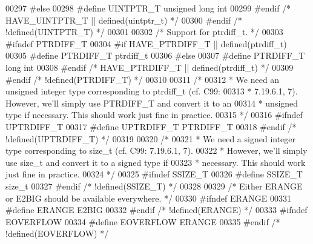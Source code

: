 \begin{DoxyCode}
{00297 \textcolor{preprocessor}{#else}
00298 \textcolor{preprocessor}{#define UINTPTR\_T unsigned long int}
00299 \textcolor{preprocessor}{#endif  }\textcolor{comment}{/* HAVE\_UINTPTR\_T || defined(uintptr\_t) */}\textcolor{preprocessor}{}
00300 \textcolor{preprocessor}{#endif  }\textcolor{comment}{/* !defined(UINTPTR\_T) */}\textcolor{preprocessor}{}
00301 
00302 \textcolor{comment}{/* Support for ptrdiff\_t. */}
00303 \textcolor{preprocessor}{#ifndef PTRDIFF\_T}
00304 \textcolor{preprocessor}{#if HAVE\_PTRDIFF\_T || defined(ptrdiff\_t)}
00305 \textcolor{preprocessor}{#define PTRDIFF\_T ptrdiff\_t}
00306 \textcolor{preprocessor}{#else}
00307 \textcolor{preprocessor}{#define PTRDIFF\_T long int}
00308 \textcolor{preprocessor}{#endif  }\textcolor{comment}{/* HAVE\_PTRDIFF\_T || defined(ptrdiff\_t) */}\textcolor{preprocessor}{}
00309 \textcolor{preprocessor}{#endif  }\textcolor{comment}{/* !defined(PTRDIFF\_T) */}\textcolor{preprocessor}{}
00310 
00311 \textcolor{comment}{/*}
00312 \textcolor{comment}{ * We need an unsigned integer type corresponding to ptrdiff\_t (cf. C99:}
00313 \textcolor{comment}{ * 7.19.6.1, 7).  However, we'll simply use PTRDIFF\_T and convert it to an}
00314 \textcolor{comment}{ * unsigned type if necessary.  This should work just fine in practice.}
00315 \textcolor{comment}{ */}
00316 \textcolor{preprocessor}{#ifndef UPTRDIFF\_T}
00317 \textcolor{preprocessor}{#define UPTRDIFF\_T PTRDIFF\_T}
00318 \textcolor{preprocessor}{#endif  }\textcolor{comment}{/* !defined(UPTRDIFF\_T) */}\textcolor{preprocessor}{}
00319 
00320 \textcolor{comment}{/*}
00321 \textcolor{comment}{ * We need a signed integer type corresponding to size\_t (cf. C99: 7.19.6.1, 7).}
00322 \textcolor{comment}{ * However, we'll simply use size\_t and convert it to a signed type if}
00323 \textcolor{comment}{ * necessary.  This should work just fine in practice.}
00324 \textcolor{comment}{ */}
00325 \textcolor{preprocessor}{#ifndef SSIZE\_T}
00326 \textcolor{preprocessor}{#define SSIZE\_T size\_t}
00327 \textcolor{preprocessor}{#endif  }\textcolor{comment}{/* !defined(SSIZE\_T) */}\textcolor{preprocessor}{}
00328 
00329 \textcolor{comment}{/* Either ERANGE or E2BIG should be available everywhere. */}
00330 \textcolor{preprocessor}{#ifndef ERANGE}
00331 \textcolor{preprocessor}{#define ERANGE E2BIG}
00332 \textcolor{preprocessor}{#endif  }\textcolor{comment}{/* !defined(ERANGE) */}\textcolor{preprocessor}{}
00333 \textcolor{preprocessor}{#ifndef EOVERFLOW}
00334 \textcolor{preprocessor}{#define EOVERFLOW ERANGE}
00335 \textcolor{preprocessor}{#endif  }\textcolor{comment}{/* !defined(EOVERFLOW) */}\textcolor{preprocessor}{}
}
\end{DoxyCode}
